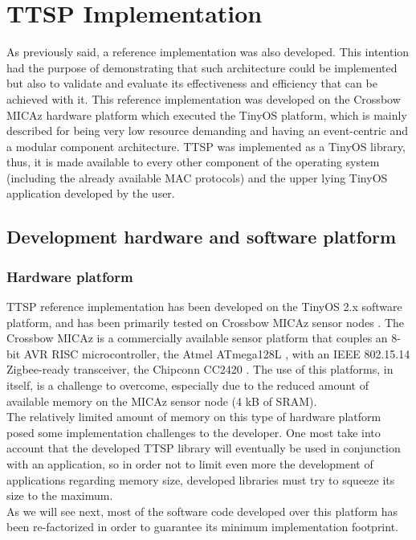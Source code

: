 \chapter{TTSP Implementation}

As previously said, a reference implementation was also developed. This intention had the purpose of demonstrating that such architecture could be implemented but also to validate and evaluate its effectiveness and efficiency that can be achieved with it. This reference implementation was developed on the Crossbow MICAz hardware platform which executed the TinyOS platform, which is mainly described for being very low resource demanding and having an event-centric and a modular component architecture. TTSP was implemented as a TinyOS library, thus, it is made available to every other component of the operating system (including the already available MAC protocols) and the upper lying TinyOS application developed by the user. 

\setcounter{secnumdepth}{2}
\section{Development hardware and software platform}

\subsection{Hardware platform}
TTSP reference implementation has been developed on the TinyOS 2.x software platform, and has been primarily tested on Crossbow MICAz sensor nodes \cite{crossbow04}. The Crossbow MICAz is a commercially available sensor platform that couples an 8-bit AVR RISC microcontroller, the Atmel ATmega128L \cite{atmel08}, with an IEEE 802.15.14 Zigbee-ready transceiver, the Chipconn CC2420 \cite{cc04}. The use of this platforms, in itself, is a challenge to overcome, especially due to the reduced amount of available memory on the MICAz sensor node (4 kB of SRAM).\\
The relatively limited amount of memory on this type of hardware platform posed some implementation challenges to the developer. One most take into account that the developed TTSP library will eventually be used in conjunction with an application, so in order not to limit even more the development of applications regarding memory size, developed libraries must try to squeeze its size to the maximum.\\
As we will see next, most of the software code developed over this platform has been re-factorized in order to guarantee its minimum implementation footprint.

